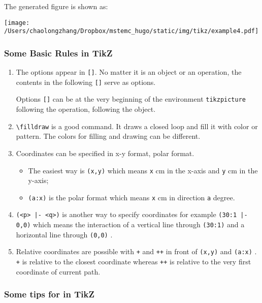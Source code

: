 The generated figure is shown as:
\begin{center}
\texttt{[image: /Users/chaolongzhang/Dropbox/mstemc\_hugo/static/img/tikz/example4.pdf]}
\end{center}


\subsubsection{Some Basic Rules in TikZ}
\label{sec:orge995912}


\begin{enumerate}
\item The options appear in \texttt{[]}. No matter it is an object or an operation, the
contents in the following  \texttt{[]} serve as options.

Options \texttt{[]} can be at the very beginning of the environment \texttt{tikzpicture}
following the operation, following the object.

\item \texttt{\textbackslash{}filldraw} is a good command. It draws a closed loop and fill it with color or
pattern. The colors for filling and drawing can be different.

\item Coordinates can be specified in x-y format, polar format.
\begin{itemize}
\item The easiest way is \texttt{(x,y)} which means \texttt{x} cm in the x-axis and \texttt{y} cm in the
y-axis;
\item \texttt{(a:x)} is the polar format which means \texttt{x} cm in direction \texttt{a} degree.
\end{itemize}
\item \texttt{(<p> |- <q>)} is another way to specify coordinates for example \texttt{(30:1 |- 0,0)}
which means the interaction of a vertical line through \texttt{(30:1)} and a
horizontal line through \texttt{(0,0)} .
\item Relative coordinates are possible with \texttt{+} and \texttt{++} in front of \texttt{(x,y)} and \texttt{(a:x)} .
\texttt{+} is relative to the closest coordinate whereas \texttt{++} is relative to the very
first coordinate of current path.
\end{enumerate}

\subsubsection{Some tips for in TikZ}
\label{sec:org742f086}


